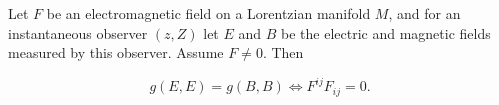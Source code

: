 Let $F$ be an electromagnetic field on a Lorentzian manifold $M$, and for an instantaneous observer $(z, Z)$ let $E$ and $B$ be the electric and magnetic fields measured by this observer. Assume $F \neq 0$. Then

$$g(E, E) = g(B, B) \iff F^{ij} F_{ij} = 0.$$
